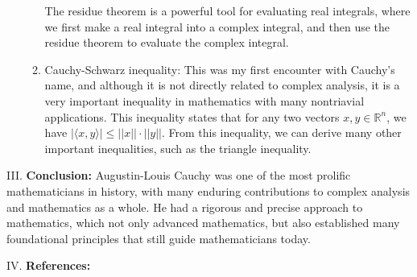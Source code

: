 \documentclass[11pt]{article}
\begin{document}
\begin{enumerate}[label=\Alph*.]
\begin{enumerate}[label=\arabic*.]
        The residue theorem is a powerful tool for evaluating real integrals, where we first make a real integral into a complex integral, and then use the residue theorem to evaluate the complex integral. \cite{LangComplexAnalysis1998}
        \item Cauchy-Schwarz inequality: This was my first encounter with Cauchy's name, and although it is not directly related to complex analysis, it is a very important inequality in mathematics with many nontriavial applications.
        This inequality states that for any two vectors $x, y \in \mathbb{R}^n$, we have $|\langle x, y \rangle| \leq ||x|| \cdot ||y||$.
        From this inequality, we can derive many other important inequalities, such as the triangle inequality. \cite{BerkeleyNotes}
    \end{enumerate}
\end{enumerate}

\noindent III. \textbf{Conclusion: } Augustin-Louis Cauchy was one of the most prolific mathematicians in history, with many enduring contributions to complex analysis and mathematics as a whole.
He had a rigorous and precise approach to mathematics, which not only advanced mathematics, but also established many foundational principles that still guide mathematicians today.

\vspace{0.1in}

\noindent IV. \textbf{References:}
\nocite{*}
\printbibliography
\end{document}
